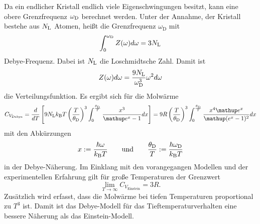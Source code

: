 Da ein endlicher Kristall endlich viele Eigenschwingungen besitzt, kann eine obere Grenzfrequenz $\omega_\text D$ berechnet werden. 
Unter der Annahme, der Kristall bestehe aus $N_\text L$ Atomen, heißt die Grenzfrequenz $\omega_\text{D}$ mit 
\begin{equation}
	\int_0^{\omega_\text D} Z(\omega) d\omega = 3 N_\text L
	\label{eqn:wd}
\end{equation}
Debye-Frequenz. 
Dabei ist $N_\text L$ die Loschmidtsche Zahl.
Damit ist 
\begin{equation}
	Z(\omega)d\omega = \frac{9 N_\text L}{\omega_\text D ^3}\omega^2 d\omega
	\label{eqn:z2}
\end{equation}
die Verteilungsfunktion.
Es ergibt sich für die Molwärme
\begin{equation}
	C_{V_\text{Debye}} = \frac{d}{dT}\left[9 N_\text L k_\text B T \left(\frac{T}{\theta_\text D}\right)^3 \int_0^{\frac{\theta_\text D}{T}} \frac{x^3}{\mathup e^x -1} dx \right] = 9 R \left(\frac{T}{\theta_\text D}\right)^3 \int_0^{\frac{\theta_\text D}{T}} \frac{x^4\mathup e^x}{\mathup (e^x -1)^2} dx
	\label{eqn:cvd}
\end{equation}
mit den Abkürzungen
\begin{equation*}
	x := \frac{\hbar\omega}{k_\text B T}\qquad\text{und}\qquad \frac{\theta_\text D}{T} :=\frac{\hbar\omega_\text D }{k_\text B T}
\end{equation*}
in der Debye-Näherung.
Im Einklang mit den vorangegangen Modellen und der experimentellen Erfahrung gilt für große Temperaturen der Grenzwert 
\begin{equation}
	\lim_{T\to\infty} C_{V_\text{Einstein}} = 3R.
\end{equation}
Zusätzlich wird erfasst, dass die Molwärme bei tiefen Temperaturen  proportional zu $T^3$ ist. 
Damit ist das Debye-Modell für das Tieftemperaturverhalten eine bessere Näherung als das Einstein-Modell.
